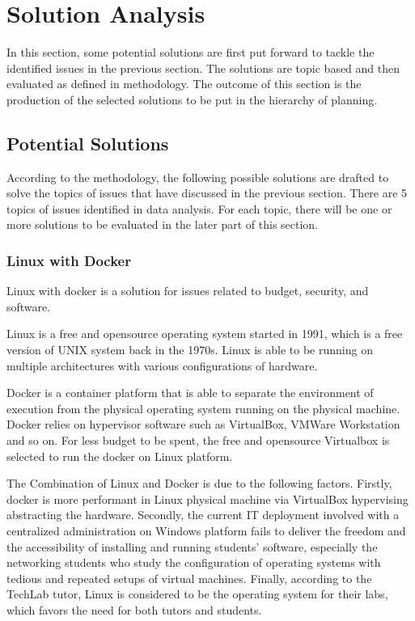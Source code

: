 
\section{Solution Analysis}

In this section, some potential solutions are first put forward to tackle the identified issues in the previous section. The solutions are topic based and then evaluated as defined in methodology. The outcome of this section is the production of the selected solutions to be put in the hierarchy of planning.

\subsection{Potential Solutions}

According to the methodology, the following possible solutions are drafted to solve the topics of issues that have discussed in the previous section. There are 5 topics of issues identified in data analysis. For each topic, there will be one or more solutions to be evaluated in the later part of this section.

\subsubsection{Linux with Docker}
Linux with docker is a solution for issues related to budget, security, and software.

Linux is a free and opensource operating system started in 1991, which is a free version of UNIX system back in the 1970s. Linux is able to be running on multiple architectures with various configurations of hardware.

Docker is a container platform that is able to separate the environment of execution from the physical operating system running on the physical machine. Docker relies on hypervisor software such as VirtualBox, VMWare Workstation and so on. For less budget to be spent, the free and opensource Virtualbox is selected to run the docker on Linux platform.

The Combination of Linux and Docker is due to the following factors. Firstly, docker is more performant in Linux physical machine via VirtualBox hypervising abstracting the hardware. Secondly, the current IT deployment involved with a centralized administration on Windows platform fails to deliver the freedom and the accessibility of installing and running students' software, especially the networking students who study the configuration of operating systems with tedious and repeated setups of virtual machines. Finally, according to the TechLab tutor, Linux is considered to be the operating system for their labs, which favors the need for both tutors and students.

